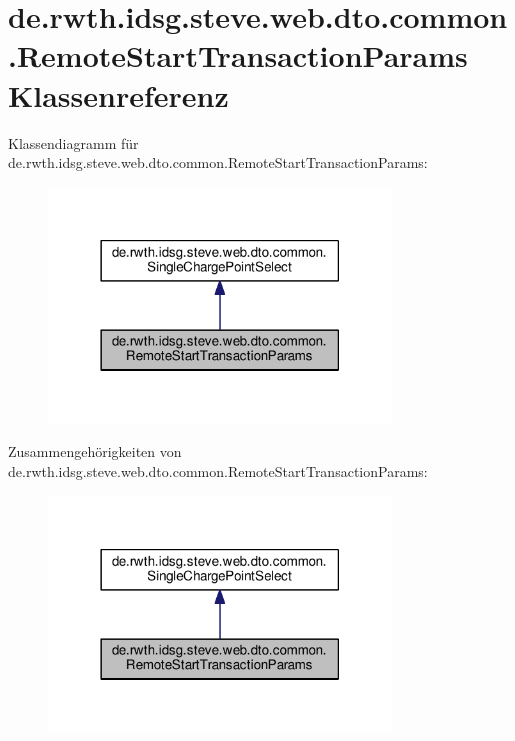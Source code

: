\hypertarget{classde_1_1rwth_1_1idsg_1_1steve_1_1web_1_1dto_1_1common_1_1_remote_start_transaction_params}{\section{de.\+rwth.\+idsg.\+steve.\+web.\+dto.\+common.\+Remote\+Start\+Transaction\+Params Klassenreferenz}
\label{classde_1_1rwth_1_1idsg_1_1steve_1_1web_1_1dto_1_1common_1_1_remote_start_transaction_params}
}


Klassendiagramm für de.\+rwth.\+idsg.\+steve.\+web.\+dto.\+common.\+Remote\+Start\+Transaction\+Params\+:\nopagebreak
\begin{figure}[H]
\begin{center}
\leavevmode
\includegraphics[width=258pt]{classde_1_1rwth_1_1idsg_1_1steve_1_1web_1_1dto_1_1common_1_1_remote_start_transaction_params__inherit__graph}
\end{center}
\end{figure}


Zusammengehörigkeiten von de.\+rwth.\+idsg.\+steve.\+web.\+dto.\+common.\+Remote\+Start\+Transaction\+Params\+:\nopagebreak
\begin{figure}[H]
\begin{center}
\leavevmode
\includegraphics[width=258pt]{classde_1_1rwth_1_1idsg_1_1steve_1_1web_1_1dto_1_1common_1_1_remote_start_transaction_params__coll__graph}
\end{center}
\end{figure}



